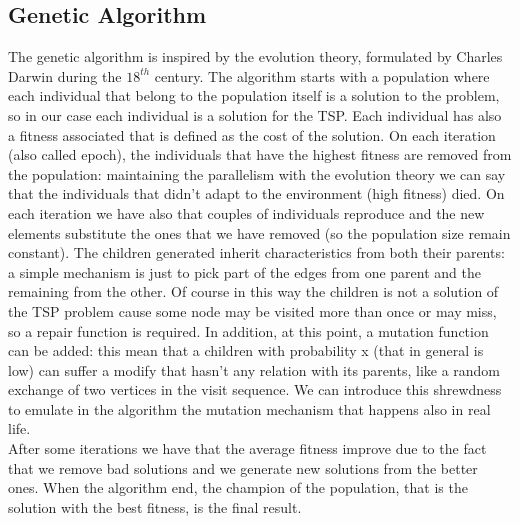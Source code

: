 \subsection{Genetic Algorithm}
The genetic algorithm is inspired by the evolution theory, formulated by Charles Darwin during the $18^{th}$ century. 
The algorithm starts with a population where each individual that belong to the population itself is a solution to the problem, so in our case each individual is a solution for the TSP. Each individual has also a fitness associated that is defined as the cost of the solution. On each iteration (also called epoch), the individuals that have the highest fitness are removed from the population: maintaining the parallelism with the evolution theory we can say that the individuals that didn't adapt to the environment (high fitness) died.
On each iteration we have also that couples of individuals reproduce and the new elements substitute the ones that we have removed (so the population size remain constant). The children generated inherit characteristics from both their parents: a simple mechanism is just to pick part of the edges from one parent and the remaining from the other. Of course in this way the children is not a solution of the TSP problem cause some node may be visited more than once or may miss, so a repair function is required. In addition, at this point, a mutation function can be added: this mean that a children with probability x (that in general is low) can suffer a modify that hasn't any relation with its parents, like a random exchange of two vertices in the visit sequence. We can introduce this shrewdness to emulate in the algorithm the mutation mechanism that happens also in real life.\\
After some iterations we have that the average fitness improve due to the fact that we remove bad solutions and we generate new solutions from the better ones. When the algorithm end, the champion of the population, that is the solution with the best fitness, is the final result. \\


